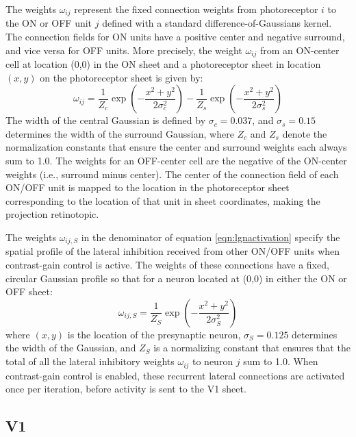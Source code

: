\documentclass{article}
\begin{document}
The weights $\omega_{ij}$ represent the fixed connection weights from
photoreceptor $i$ to the ON or OFF unit $j$ defined with a standard
difference-of-Gaussians kernel. The connection fields for ON units
have a positive center and negative surround, and vice versa for OFF
units. More precisely, the weight $\omega_{ij}$ from an ON-center cell
at location (0,0) in the ON sheet and a photoreceptor sheet in
location $(x,y)$ on the photoreceptor sheet is given by:
\begin{equation}
\omega_{ij}=\frac{1}{Z_c}\exp{\left(-\frac{x^{2}+y^{2}}{2\sigma_{c}^{2}}\right)}-\frac{1}{Z_s}\exp\left(-\frac{x^{2}+y^{2}}{2\sigma_{s}^{2}}\right)
\label{eqn:DoG}
\end{equation}
The width of the central Gaussian is defined by $\sigma_{c}=0.037$, and
$\sigma_{s}=0.15$ determines the width of the surround Gaussian, where
$Z_c$ and $Z_s$ denote the normalization constants that ensure the
center and surround weights each always sum to 1.0. The weights for an
OFF-center cell are the negative of the ON-center weights (i.e., surround
minus center). The center of the connection field of each ON/OFF unit
is mapped to the location in the photoreceptor sheet corresponding to the
location of that unit in sheet coordinates, making the projection
retinotopic.

The weights $\omega_{ij, S}$ in the denominator of equation
\ref{eqn:lgnactivation} specify the spatial profile of the
lateral inhibition received from other ON/OFF units when
contrast-gain control is active. The weights of these connections have
a fixed, circular Gaussian profile so that for a neuron located at
(0,0) in either the ON or OFF sheet:
\begin{equation}
\omega_{ij,S}=\frac{1}{Z_S}\exp\left(-\frac{x^{2}+y^{2}}{2\sigma_{S}^{2}}\right)
\label{eqn:gauss}
\end{equation}
where $(x, y)$ is the location of the presynaptic neuron,
$\sigma_{S}=0.125$ determines the width of the Gaussian, and $Z_S$ is
a normalizing constant that ensures that the total of all the lateral
inhibitory weights $\omega_{ij}$ to neuron $j$ sum to 1.0.  When
contrast-gain control is enabled, these recurrent lateral connections
are activated once per iteration, before activity is sent to the V1
sheet.

\subsection*{V1}
\end{document}
